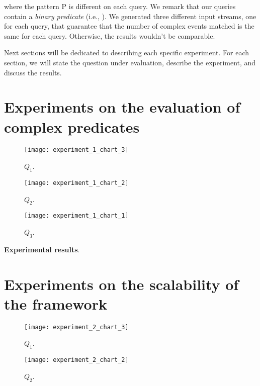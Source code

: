 where the pattern \textrm{P} is different on each query. We remark that our queries contain a \emph{binary predicate} (i.e., ). We generated three different input streams, one for each query, that guarantee that the number of complex events matched is the same for each query. Otherwise, the results wouldn't be comparable.

Next sections will be dedicated to describing each specific experiment. For each section, we will state the question under evaluation, describe the experiment, and discuss the results.

\section{Experiments on the evaluation of complex predicates}\label{sec:predicates}


\begin{figure}[H]
  \centering
  \texttt{[image: experiment\_1\_chart\_3]}
  \caption{$Q_{1}$.}
  \label{fig:???}
\end{figure}

\begin{figure}[H]
  \centering
  \texttt{[image: experiment\_1\_chart\_2]}
  \caption{$Q_{2}$.}
  \label{fig:???}
\end{figure}

\begin{figure}[H]
  \centering
  \texttt{[image: experiment\_1\_chart\_1]}
  \caption{$Q_{3}$.}
  \label{fig:???}
\end{figure}


\textbf{Experimental results}.

\section{Experiments on the scalability of the framework}\label{sec:scalability}

\begin{figure}[H]
  \centering
  \texttt{[image: experiment\_2\_chart\_3]}
  \caption{$Q_{1}$.}
  \label{fig:???}
\end{figure}

\begin{figure}[H]
  \centering
  \texttt{[image: experiment\_2\_chart\_2]}
  \caption{$Q_{2}$.}
  \label{fig:???}
\end{figure}

